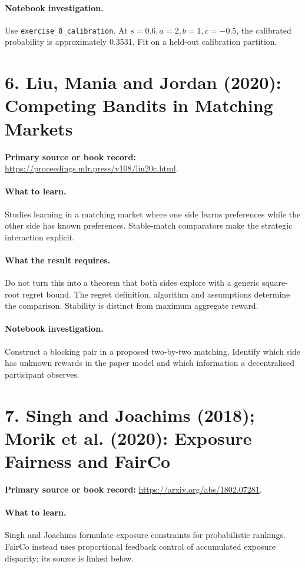 \documentclass[11pt]{scrartcl}
\begin{document}
\paragraph{Notebook investigation.} Use \texttt{exercise\_8\_calibration}. At $s=0.6,a=2,b=1,c=-0.5$, the calibrated probability is approximately 0.3531. Fit on a held-out calibration partition.

\section*{6. Liu, Mania and Jordan (2020): Competing Bandits in Matching Markets}
\textbf{Primary source or book record:} \url{https://proceedings.mlr.press/v108/liu20c.html}.

\paragraph{What to learn.} Studies learning in a matching market where one side learns preferences while the other side has known preferences. Stable-match comparators make the strategic interaction explicit.

\paragraph{What the result requires.} Do not turn this into a theorem that both sides explore with a generic square-root regret bound. The regret definition, algorithm and assumptions determine the comparison. Stability is distinct from maximum aggregate reward.

\paragraph{Notebook investigation.} Construct a blocking pair in a proposed two-by-two matching. Identify which side has unknown rewards in the paper model and which information a decentralised participant observes.

\section*{7. Singh and Joachims (2018); Morik et al. (2020): Exposure Fairness and FairCo}
\textbf{Primary source or book record:} \url{https://arxiv.org/abs/1802.07281}.

\paragraph{What to learn.} Singh and Joachims formulate exposure constraints for probabilistic rankings. FairCo instead uses proportional feedback control of accumulated exposure disparity; its source is linked below.
\end{document}
